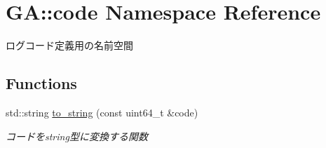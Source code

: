\hypertarget{namespace_g_a_1_1code}{}\section{GA\+::code Namespace Reference}
\label{namespace_g_a_1_1code}


ログコード定義用の名前空間  


\subsection*{Functions}
\begin{DoxyCompactItemize}
\item 
std\+::string \mbox{\hyperlink{namespace_g_a_1_1code_abc5de9a375bbfb29df3bfee41dbe8c60}{to\+\_\+string}} (const uint64\+\_\+t \&code)
\begin{DoxyCompactList}\small\item\em コードをstring型に変換する関数 \end{DoxyCompactList}\end{DoxyCompactItemize}
